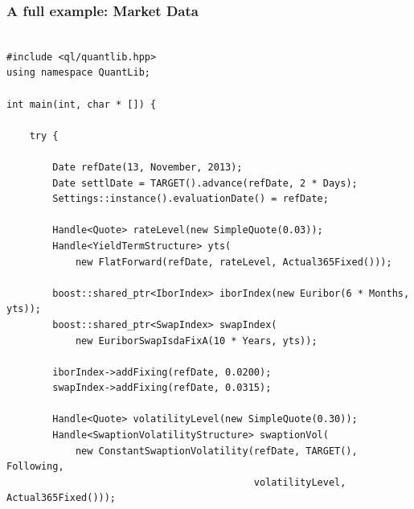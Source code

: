 \documentclass{beamer}
\begin{document}

\begin{frame}[fragile]
\frametitle{A full example: Market Data}
\begin{verbatim}

#include <ql/quantlib.hpp>
using namespace QuantLib;

int main(int, char * []) {

    try {

        Date refDate(13, November, 2013);
        Date settlDate = TARGET().advance(refDate, 2 * Days);
        Settings::instance().evaluationDate() = refDate;

        Handle<Quote> rateLevel(new SimpleQuote(0.03));
        Handle<YieldTermStructure> yts(
            new FlatForward(refDate, rateLevel, Actual365Fixed()));

        boost::shared_ptr<IborIndex> iborIndex(new Euribor(6 * Months, yts));
        boost::shared_ptr<SwapIndex> swapIndex(
            new EuriborSwapIsdaFixA(10 * Years, yts));

        iborIndex->addFixing(refDate, 0.0200);
        swapIndex->addFixing(refDate, 0.0315);

        Handle<Quote> volatilityLevel(new SimpleQuote(0.30));
        Handle<SwaptionVolatilityStructure> swaptionVol(
            new ConstantSwaptionVolatility(refDate, TARGET(), Following,
                                           volatilityLevel, Actual365Fixed()));

\end{verbatim}
\end{frame}
\end{document}

